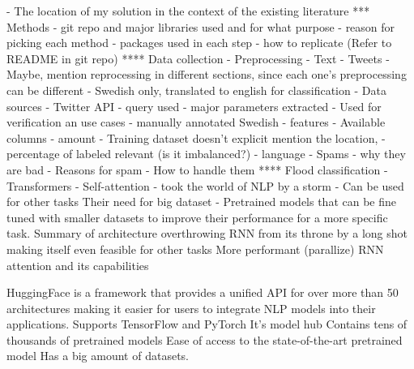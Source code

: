 \documentclass[a4paper, 12pt]{article}
\begin{document}
- The location of my solution in the context of the existing literature
*** Methods
- git repo and major libraries used and for what purpose
- reason for picking each method
- packages used in each step
- how to replicate (Refer to README in git repo)
**** Data collection
- Preprocessing
  - Text
  - Tweets
  - Maybe, mention reprocessing in different sections, since each one's 
  preprocessing can be different
  - Swedish only, translated to english for classification
- Data sources
  - Twitter API
    - query used
    - major parameters extracted
    - Used for verification an use cases
  - manually annotated Swedish
    - features
    - Available columns
    - amount
    - Training dataset doesn't explicit mention the location,
    - percentage of labeled relevant (is it imbalanced?)
    - language
- Spams
  - why they are bad
  - Reasons for spam
  - How to handle them
**** Flood classification
- Transformers - Self-attention - took the world of NLP by a storm - 
Can be used for other tasks Their need for big dataset - 
Pretrained models that can be fine tuned with smaller datasets to
improve their performance for a more specific task.
Summary of architecture
overthrowing RNN from its throne by a long shot making itself even feasible 
for other tasks
More performant (parallize)
RNN attention and its capabilities

HuggingFace is a framework that provides a unified API for over more than 
50 architectures making it
easier for users to integrate NLP models into their applications.
Supports TensorFlow and PyTorch
It's model hub Contains tens of thousands of pretrained models
Ease of access to the state-of-the-art pretrained model
Has a big amount of datasets.
\end{document}
